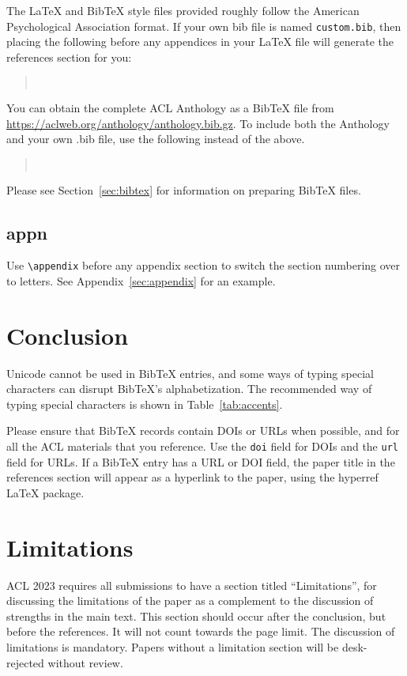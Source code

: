 \documentclass[11pt]{article}
\begin{document}
The \LaTeX{} and Bib\TeX{} style files provided roughly follow the American Psychological Association format.
If your own bib file is named \texttt{custom.bib}, then placing the following before any appendices in your \LaTeX{} file will generate the references section for you:
\begin{quote}
\begin{verbatim}


\end{verbatim}
\end{quote}
You can obtain the complete ACL Anthology as a Bib\TeX{} file from \url{https://aclweb.org/anthology/anthology.bib.gz}.
To include both the Anthology and your own .bib file, use the following instead of the above.
\begin{quote}
\begin{verbatim}


\end{verbatim}
\end{quote}
Please see Section~\ref{sec:bibtex} for information on preparing Bib\TeX{} files.

\subsection{appn}

Use \verb|\appendix| before any appendix section to switch the section numbering over to letters. See Appendix~\ref{sec:appendix} for an example.

\section{Conclusion}

Unicode cannot be used in Bib\TeX{} entries, and some ways of typing special characters can disrupt Bib\TeX's alphabetization. The recommended way of typing special characters is shown in Table~\ref{tab:accents}.

Please ensure that Bib\TeX{} records contain DOIs or URLs when possible, and for all the ACL materials that you reference.
Use the \verb|doi| field for DOIs and the \verb|url| field for URLs.
If a Bib\TeX{} entry has a URL or DOI field, the paper title in the references section will appear as a hyperlink to the paper, using the hyperref \LaTeX{} package.

\section*{Limitations}
ACL 2023 requires all submissions to have a section titled ``Limitations'', for discussing the limitations of the paper as a complement to the discussion of strengths in the main text. This section should occur after the conclusion, but before the references. It will not count towards the page limit.
The discussion of limitations is mandatory. Papers without a limitation section will be desk-rejected without review.
\end{document}
